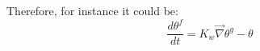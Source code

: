 Therefore, for instance it could be:
\begin{equation}
\frac{d \theta^f}{dt} = K_w \vec{\nabla}{\theta^g - \theta}
\end{equation}